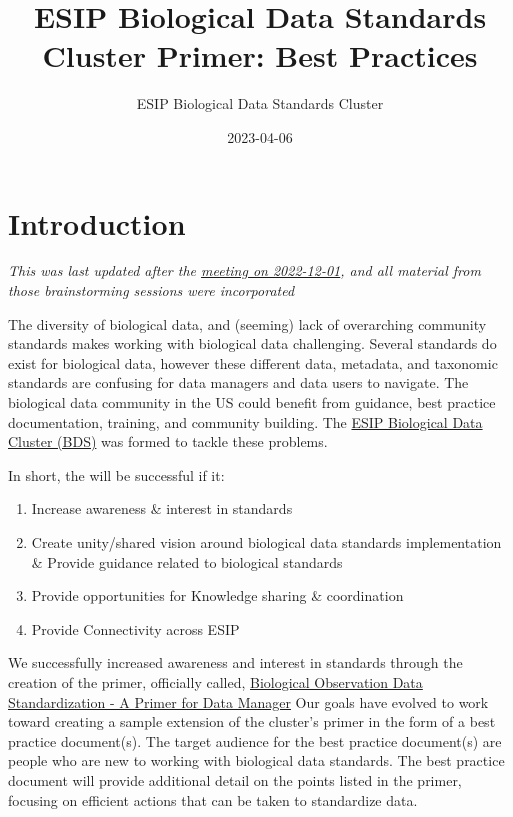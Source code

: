\documentclass[
  oneside]{book}
\title{ESIP Biological Data Standards Cluster Primer: Best Practices}
\author{ESIP Biological Data Standards Cluster}
\date{2023-04-06}
\providecommand{\tightlist}{%
  \setlength{\itemsep}{0pt}\setlength{\parskip}{0pt}}
\begin{document}
\maketitle

{
\hypersetup{linkcolor=}
\setcounter{tocdepth}{1}
\tableofcontents
}
\hypertarget{introduction}{%
\chapter{Introduction}\label{introduction}}

\emph{This was last updated after the \href{https://docs.google.com/document/d/1cBQEy_-MNYm8SBN-0iY_X2esd6MSM-pZE_MZD6rv0Do/edit\#}{meeting on 2022-12-01}, and all material from those brainstorming sessions were incorporated}

The diversity of biological data, and (seeming) lack of overarching community standards makes working with biological data challenging. Several standards do exist for biological data, however these different data, metadata, and taxonomic standards are confusing for data managers and data users to navigate. The biological data community in the US could benefit from guidance, best practice documentation, training, and community building. The \href{https://wiki.esipfed.org/Biological_Data_Standards_Cluster}{ESIP Biological Data Cluster (BDS)} was formed to tackle these problems.

In short, the will be successful if it:

\begin{enumerate}
\def\labelenumi{\arabic{enumi}.}
\tightlist
\item
  Increase awareness \& interest in standards
\item
  Create unity/shared vision around biological data standards implementation \& Provide guidance related to biological standards
\item
  Provide opportunities for Knowledge sharing \& coordination
\item
  Provide Connectivity across ESIP
\end{enumerate}

We successfully increased awareness and interest in standards through the creation of the primer, officially called, \href{https://doi.org/10.6084/m9.figshare.16806712.v1}{Biological Observation Data Standardization - A Primer for Data Manager} Our goals have evolved to work toward creating a sample extension of the cluster's primer in the form of a best practice document(s). The target audience for the best practice document(s) are people who are new to working with biological data standards. The best practice document will provide additional detail on the points listed in the primer, focusing on efficient actions that can be taken to standardize data.
\end{document}
